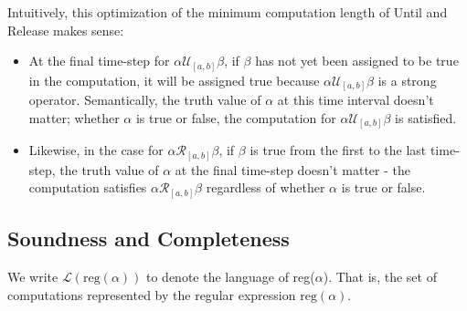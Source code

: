 \documentclass[runningheads]{llncs}
\begin{document}
 \noindent Intuitively, this optimization of the minimum computation length of Until and Release makes sense:
 \begin{itemize}
     \item At the final time-step for $\alpha \mathcal{U}_{[a,b]} \beta$, if $\beta$ has not yet been assigned to be true in the computation, it will be assigned true because $\alpha \mathcal{U}_{[a,b]} \beta$ is a strong operator. Semantically, the truth value of $\alpha$ at this time interval doesn't matter; whether $\alpha$ is true or false, the computation for $\alpha \mathcal{U}_{[a,b]} \beta$ is satisfied.
     \item Likewise, in the case for $\alpha \mathcal{R}_{[a,b]} \beta$, if $\beta$ is true from the first to the last time-step, the truth value of $\alpha$ at the final time-step doesn't matter - the computation satisfies $\alpha \mathcal{R}_{[a,b]} \beta$ regardless of whether $\alpha$ is true or false.
 \end{itemize}
 
\subsection{Soundness and Completeness}
 We write $\mathscr{L}(\text{reg}(\alpha))$ to denote the language of reg($\alpha$). That is, the set of computations represented by the regular expression $\text{reg}(\alpha)$.
 
\end{document}
